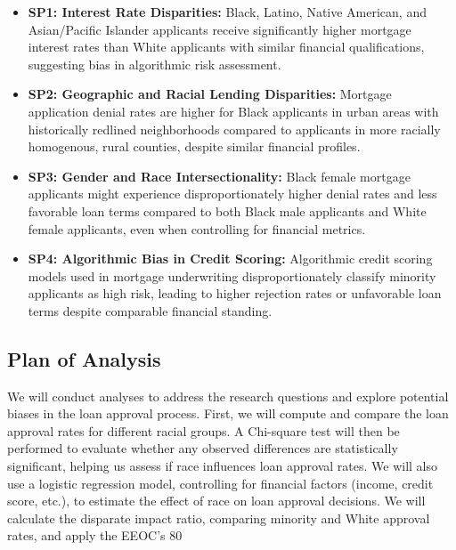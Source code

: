 \documentclass[manuscript,authorversion,nonacm]{acmart} %
\begin{document}
\begin{itemize}
    \item \textbf{SP1: Interest Rate Disparities:} Black, Latino, Native American, and Asian/Pacific Islander applicants receive significantly higher mortgage interest rates than White applicants with similar financial qualifications, suggesting bias in algorithmic risk assessment.
    
    \item \textbf{SP2: Geographic and Racial Lending Disparities:} Mortgage application denial rates are higher for Black applicants in urban areas with historically redlined neighborhoods compared to applicants in more racially homogenous, rural counties, despite similar financial profiles.
    
    \item \textbf{SP3: Gender and Race Intersectionality:} Black female mortgage applicants might experience disproportionately higher denial rates and less favorable loan terms compared to both Black male applicants and White female applicants, even when controlling for financial metrics.
    
    \item \textbf{SP4: Algorithmic Bias in Credit Scoring:} Algorithmic credit scoring models used in mortgage underwriting disproportionately classify minority applicants as high risk, leading to higher rejection rates or unfavorable loan terms despite comparable financial standing.
\end{itemize}

\subsection{Plan of Analysis}

We will conduct analyses to address the research questions and explore potential biases in the loan approval process. First, we will compute and compare the loan approval rates for different racial groups. A Chi-square test will then be performed to evaluate whether any observed differences are statistically significant, helping us assess if race influences loan approval rates. We will also use a logistic regression model, controlling for financial factors (income, credit score, etc.), to estimate the effect of race on loan approval decisions. We will calculate the disparate impact ratio, comparing minority and White approval rates, and apply the EEOC's 80%
\end{document}
